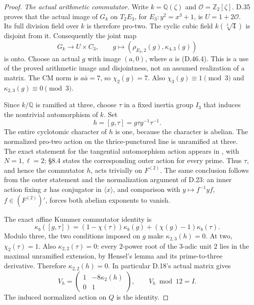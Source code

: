 \begin{proof}
\emph{The actual arithmetic commutator.}
Write \(k=\mathbb Q(\zeta)\) and
\(\mathcal O=\mathbb Z_2[\zeta]\).
D.35 proves that the actual image of
\(G_k\) on \(T_2E_3\), for
\(E_3:y^2=x^3+1\), is
\(U=1+2\mathcal O\). Its full division
field over \(k\) is therefore pro-two.
The cyclic cubic field
\(k(\sqrt[3]{4})\) is disjoint from it.
Consequently the joint map
\[
 G_k\longrightarrow U\times C_3,\qquad
          g\longmapsto(\rho_{E_3,2}(g),\kappa_{4,3}(g))
\]
is onto. Choose an actual \(g\) with
image \((a,0)\), where \(a\) is
(D.46.4). This is a use of the proved
arithmetic image and disjointness,
not an assumed realization of a
matrix. The CM norm is \(a\bar a=7\),
so \(\chi_2(g)=7\). Also
\(\chi_3(g)\equiv1\pmod3\) and
\(\kappa_{2,3}(g)\equiv0\pmod3\).

Since \(k/\mathbb Q\) is ramified
at three, choose \(\tau\) in a
fixed inertia group \(I_3\) that
induces the nontrivial automorphism
of \(k\). Set
\[
                   h=[g,\tau]=g\tau g^{-1}\tau^{-1}.           \tag{D.46.10}
\]
The entire cyclotomic character
of \(h\) is one, because the
character is abelian. The
normalized pro-two action on
the thrice-punctured line is
unramified at three. The exact
statement for the tangential
automorphism action appears in
\cite[\S8.5, preceding Theorem 8.7]{E_HainMatsumoto},
with \(N=1,\ell=2\); \S8.4
states the corresponding outer
action for every prime.
Thus \(\tau\), and hence the
commutator \(h\), acts trivially
on \(F^{(2)}\).
The same conclusion follows
from the outer statement and
the normalization argument of
D.23: an inner action fixing
\(x\) has conjugator in
\(\langle x\rangle\), and
comparison with
\(y\mapsto f^{-1}yf\),
\(f\in(F^{(2)})'\), forces
both abelian exponents to
vanish.

The exact affine Kummer
commutator identity is
\[
 \kappa_b([g,\tau])
    =(1-\chi(\tau))\kappa_b(g)
                       +(\chi(g)-1)\kappa_b(\tau).             \tag{D.46.11}
\]
Modulo three, the two
conditions imposed on \(g\)
make \(\kappa_{2,3}(h)=0\).
At two, \(\chi_2(\tau)=1\).
Also \(\kappa_{2,2}(\tau)=0\):
every \(2\)-power root of the
\(3\)-adic unit \(2\) lies
in the maximal unramified
extension, by Hensel's lemma
and its prime-to-three
derivative. Therefore
\(\kappa_{2,2}(h)=0\).
In particular D.18's actual
matrix gives
\[
 V_h=\begin{pmatrix}1&-8\kappa_2(h)\\0&1\end{pmatrix},
                         \qquad V_h\bmod12=I.                 \tag{D.46.12}
\]
The induced normalized action
on \(Q\) is the identity.


\end{proof}
